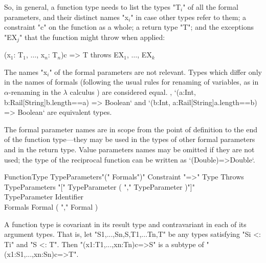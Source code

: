 {So, in general, a function type needs to list the types 
\xcdmath"T$_i$"
of all the formal parameters,
and their distinct names \xcdmath"x$_i$" in case other types refer to them; a
constraint 
\xcd"c" on the
function as a whole; a return type \xcd"T"; and the exceptions \xcdmath"EX$_j$"
that the function might throw when applied: 



\begin{xtenmath}
(x$_1$: T$_1$, $\dots$, x$_n$: T$_n$){c} => T
        throws EX$_1$, $\dots$, EX$_k$
\end{xtenmath}


The names \xcdmath"x$_i$" of the formal parameters are not relevant.  Types
which differ only in the names of formals (following the usual rules for
renaming of variables, as in {$\alpha$}-renaming in the {$\lambda$} calculus
) are considered equal.  \Eg, 
\xcd`(a:Int, b:Rail[String]{b.length==a}) => Boolean`
and 
\xcd`(b:Int, a:Rail[String]{a.length==b}) => Boolean`
are equivalent types.

The formal parameter names are in scope from the point of definition to the
end of the function type---they may be used in the types of other formal parameters
and in the return type. 
Value parameters names may be
omitted if they are not used; the type of the reciprocal function can be
written as
\xcd`(Double)=>Double`. 

\begin{grammar}
FunctionType \: TypeParameters\opt \xcd"(" Formals\opt \xcd")" Constraint\opt
\xcd"=>" Type Throws\opt \\
TypeParameters \: \xcd"[" TypeParameter ( \xcd"," TypeParameter
)\star \xcd"]" \\
TypeParameter \: Identifier \\
Formals \: Formal ( \xcd"," Formal )\star \\
\end{grammar}






A function type is covariant in its result type and contravariant in
each of its argument types. That is, let 
\xcd"S1,...,Sn,S,T1,...Tn,T" be any
types satisfying \xcd"Si <: Ti" and \xcd"S <: T". Then
\xcd"(x1:T1,...,xn:Tn){c}=>S" is a subtype of
\xcd"(x1:S1,...,xn:Sn){c}=>T".



}
